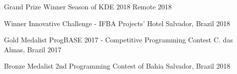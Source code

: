 
\begin{cvhonors}

  \cvhonor
    {Grand Prize Winner} %
    {Season of KDE 2018} %
    {Remote} %
    {2018} %

  \cvhonor
    {Winner} %
    {Innovative Challenge - IFBA Projects' Hotel} %
    {Salvador, Brazil} %
    {2018} %

  \cvhonor
    {Gold Medalist} %
    {ProgBASE 2017 - Competitive Programming Contest} %
    {C. das Almas, Brazil} %
    {2017} %

  \cvhonor
    {Bronze Medalist} %
    {2nd Programming Contest of Bahia} %
    {Salvador, Brazil} %
    {2018} %

\end{cvhonors}
